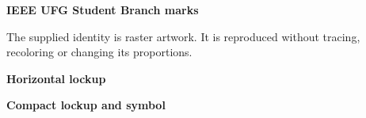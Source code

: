 \documentclass{article}
\begin{document}
\newpage
{\IEEECSHeadingFont\bfseries\Huge IEEE UFG Student Branch marks}\par
\medskip
The supplied identity is raster artwork. It is reproduced without tracing,
recoloring or changing its proportions.

\bigskip
{\IEEECSHeadingFont\bfseries\Large Horizontal lockup}\par
\medskip
\IEEEUFGStudentBranchMark[variant=horizontal,width=135mm]

\bigskip
{\IEEECSHeadingFont\bfseries\Large Compact lockup and symbol}\par
\medskip
\IEEEUFGStudentBranchMark[variant=compact,width=42mm]\hfill
\IEEEUFGStudentBranchMark[variant=symbol,width=20mm]
\end{document}
